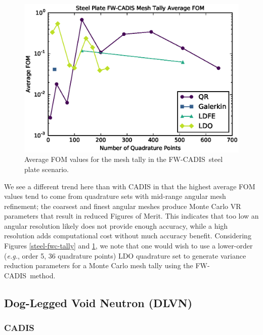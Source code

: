 \documentclass{article} %
\newcommand{\fwc}{\mbox{FW-CADIS}}
\begin{document}
\begin{figure}[!htb]
\centering
\includegraphics[max height=0.445\textheight]{steel-fwcadis-fom.eps}
\caption{Average FOM values for the mesh tally in the \fwc\ steel plate scenario.}
\label{steel-fwc-fom}
\end{figure}

We see a different trend here than with CADIS in that the highest average FOM
values tend to come from quadrature sets with mid-range angular mesh
refinement; the coarsest and finest angular meshes produce Monte Carlo VR
parameters that result in reduced Figures of Merit. This indicates that too
low an angular resolution likely does not provide enough accuracy, while a
high resolution adds computational cost without much accuracy benefit.
Considering Figures \ref{steel-fwc-tally} and \ref{steel-fwc-fom}, we note
that one would wish to use a lower-order (\textit{e.g.}, order 5, 36
quadrature points) LDO quadrature set to generate variance reduction
parameters for a Monte Carlo mesh tally using the \fwc\ method.

\FloatBarrier
\subsection{Dog-Legged Void Neutron (DLVN)}

\subsubsection{CADIS}
\end{document}
